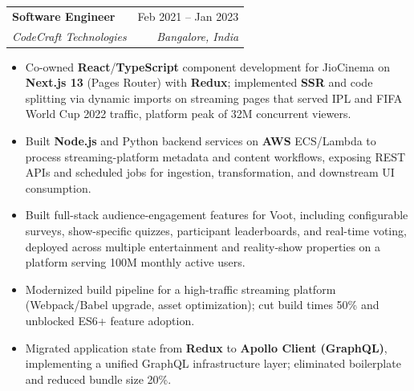 \documentclass[letterpaper,10.5pt]{article}
\makeatletter
\newcommand{\resumeItem}[1]{
  \item\small{{#1 \vspace{-2pt}}}
}
\newcommand{\resumeSubheading}[4]{
  \vspace{-2pt}\item
    \begin{tabular*}{0.97\textwidth}[t]{l@{\extracolsep{\fill}}r}
      \textbf{#1} & #2 \\
      \textit{\small#3} & \textit{\small #4} \\
    \end{tabular*}\vspace{-7pt}
}
\newcommand{\resumeItemListStart}{\begin{itemize}}
\newcommand{\resumeItemListEnd}{\end{itemize}\vspace{-5pt}}
\makeatother
\begin{document}

    \resumeSubheading
      {Software Engineer}{Feb 2021 -- Jan 2023}
      {CodeCraft Technologies}{Bangalore, India}
      \resumeItemListStart
        \resumeItem{Co-owned \textbf{React}/\textbf{TypeScript} component development for JioCinema on \textbf{Next.js 13} (Pages Router) with \textbf{Redux}; implemented \textbf{SSR} and code splitting via dynamic imports on streaming pages that served IPL and FIFA World Cup 2022 traffic, platform peak of 32M concurrent viewers.}
        \resumeItem{Built \textbf{Node.js} and Python backend services on \textbf{AWS} ECS/Lambda to process streaming-platform metadata and content workflows, exposing REST APIs and scheduled jobs for ingestion, transformation, and downstream UI consumption.}
        \resumeItem{Built full-stack audience-engagement features for Voot, including configurable surveys, show-specific quizzes, participant leaderboards, and real-time voting, deployed across multiple entertainment and reality-show properties on a platform serving 100M monthly active users.}
        \resumeItem{Modernized build pipeline for a high-traffic streaming platform (Webpack/Babel upgrade, asset optimization); cut build times 50\% and unblocked ES6+ feature adoption.}
        \resumeItem{Migrated application state from \textbf{Redux} to \textbf{Apollo Client (GraphQL)}, implementing a unified GraphQL infrastructure layer; eliminated boilerplate and reduced bundle size 20\%.}
    \resumeItemListEnd
        
\end{document}
